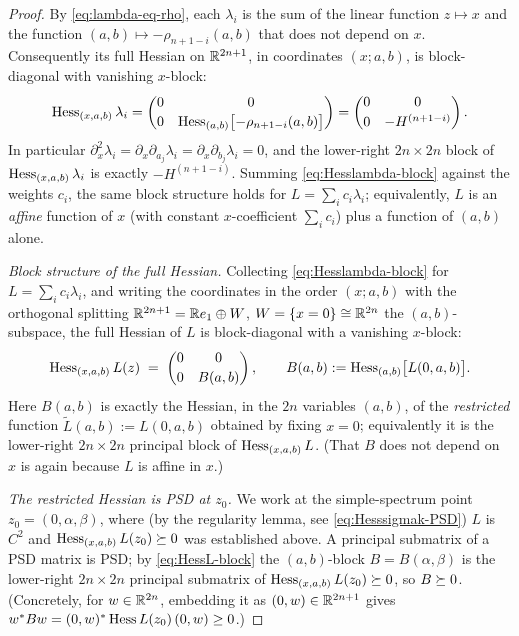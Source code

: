\begin{proof}
By \eqref{eq:lambda-eq-rho}, each $\lambda_i$ is the sum of the linear function
$z\mapsto x$ and the function $(a,b)\mapsto-\rho_{n+1-i}(a,b)$ that does not
depend on $x$. Consequently its full Hessian on $\mathbb{R}^{2n+1}$, in coordinates
$(x;a,b)$, is block-diagonal with vanishing $x$-block:
\begin{equation}\label{eq:Hesslambda-block}
\operatorname{Hess}_{(x,a,b)}\lambda_i
=\begin{pmatrix}0 & 0\\[2pt] 0 & \operatorname{Hess}_{(a,b)}\bigl[-\rho_{n+1-i}(a,b)\bigr]\end{pmatrix}
=\begin{pmatrix}0 & 0\\[2pt] 0 & -H^{(n+1-i)}\end{pmatrix}.
\end{equation}
In particular $\partial_x^2\lambda_i=\partial_x\partial_{a_j}\lambda_i
=\partial_x\partial_{b_j}\lambda_i=0$, and the lower-right $2n\times2n$ block of
$\operatorname{Hess}_{(x,a,b)}\lambda_i$ is exactly $-H^{(n+1-i)}$. Summing
\eqref{eq:Hesslambda-block} against the weights $c_i$, the same block structure
holds for $L=\sum_i c_i\lambda_i$; equivalently, $L$ is an \emph{affine} function
of $x$ (with constant $x$-coefficient $\sum_i c_i$) plus a function of $(a,b)$
alone.

\smallskip\noindent\emph{Block structure of the full Hessian.} Collecting
\eqref{eq:Hesslambda-block} for $L=\sum_i c_i\lambda_i$, and writing the
coordinates in the order $(x;a,b)$ with the orthogonal splitting
$\mathbb{R}^{2n+1}=\mathbb{R} e_1\oplus W$, $W=\{x=0\}\cong\mathbb{R}^{2n}$ the
$(a,b)$-subspace, the full Hessian of $L$ is block-diagonal with a vanishing
$x$-block:
\begin{equation}\label{eq:HessL-block}
\operatorname{Hess}_{(x,a,b)}L(z)
\;=\;
\begin{pmatrix} 0 & 0\\[2pt] 0 & B(a,b)\end{pmatrix},
\qquad
B(a,b):=\operatorname{Hess}_{(a,b)}\bigl[L(0,a,b)\bigr].
\end{equation}
Here $B(a,b)$ is exactly the Hessian, in the $2n$ variables $(a,b)$, of the
\emph{restricted} function $\tilde L(a,b):=L(0,a,b)$ obtained by fixing $x=0$;
equivalently it is the lower-right $2n\times2n$ principal block of
$\operatorname{Hess}_{(x,a,b)}L$. (That $B$ does not depend on $x$ is again because $L$ is
affine in $x$.)

\smallskip\noindent\emph{The restricted Hessian is PSD at $z_0$.} We work at the simple-spectrum
point $z_0=(0,\alpha,\beta)$, where (by the regularity lemma, see
\eqref{eq:Hesssigmak-PSD}) $L$ is $C^2$ and $\operatorname{Hess}_{(x,a,b)}L(z_0)\succeq 0$
was established above. A principal submatrix of a PSD matrix is PSD; by
\eqref{eq:HessL-block} the $(a,b)$-block $B=B(\alpha,\beta)$ is the lower-right
$2n\times2n$ principal submatrix of $\operatorname{Hess}_{(x,a,b)}L(z_0)\succeq 0$, so
$B\succeq 0$. (Concretely, for $w\in\mathbb{R}^{2n}$, embedding it as
$(0,w)\in\mathbb{R}^{2n+1}$ gives $w^\ast B w=(0,w)^\ast\operatorname{Hess} L(z_0)\,(0,w)\ge0$.)


\end{proof}
